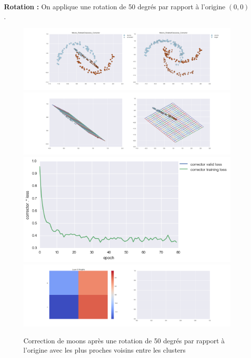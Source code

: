 
{\Large \textbf{Rotation :}} On applique une rotation de 50 degrés par rapport à l'origine $(0,0)$.

\begin{figure}[H] %
\centering
\includegraphics[width=\linewidth]{fig/24-05-2016/moons/Moons_RotatedClasswise_Corrector-DATA.png}
\includegraphics[width=\linewidth]{fig/24-05-2016/moons/Moons_RotatedClasswise_Corrector-GridCheck.png}
\includegraphics[width=0.45\linewidth]{fig/24-05-2016/moons/Moons_RotatedClasswise_Corrector-Learning_curve.png}
\includegraphics[width=\linewidth]{fig/24-05-2016/moons/Moons_RotatedClasswise_Corrector-W.png}
\caption{Correction de moons après une rotation de 50 degrés par rapport à l'origine avec les plus proches voisins entre les clusters}
\label{fig:recap-moons-rot-classwise}
\end{figure}

